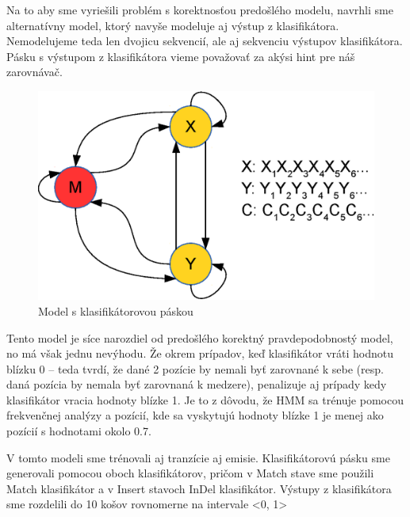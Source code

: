 Na to aby sme vyriešili problém s korektnosťou predošlého modelu, navrhli sme alternatívny model, ktorý navyše modeluje aj výstup z klasifikátora.
Nemodelujeme teda len dvojicu sekvencií, ale aj sekvenciu výstupov klasifikátora.
Pásku s výstupom z klasifikátora vieme považovať za akýsi hint pre náš zarovnávač.

\begin{figure}[htp]
    \centering
    \includegraphics[width=.5\textwidth]{images/model_clf_paska}
    \caption{Model s klasifikátorovou páskou}
\end{figure}


Tento model je síce narozdiel od predošlého korektný pravdepodobnostý model, no má však jednu nevýhodu. Že okrem prípadov, keď klasifikátor vráti hodnotu blízku 0 -- teda tvrdí, že dané 2 pozície by nemali byť zarovnané k sebe (resp. daná pozícia by nemala byť zarovnaná k medzere), penalizuje aj prípady kedy klasifikátor vracia hodnoty blízke 1. Je to z dôvodu, že HMM sa trénuje pomocou frekvenčnej analýzy a pozícií, kde sa vyskytujú hodnoty blízke 1 je menej ako pozícií s hodnotami okolo 0.7.

V tomto modeli sme trénovali aj tranzície aj emisie. Klasifikátorovú pásku sme generovali pomocou oboch klasifikátorov, pričom v Match stave sme použili Match klasifikátor a v Insert stavoch InDel klasifikátor.
Výstupy z klasifikátora sme rozdelili do 10 košov rovnomerne na intervale <0, 1>

